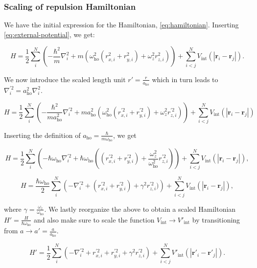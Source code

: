 \documentclass[
]{article}
\begin{document}
\hypertarget{sec:scaled_ham}{%
\subsubsection{Scaling of repulsion Hamiltonian}\label{sec:scaled_ham}}

We have the initial expression for the Hamiltonian,
\eqref{eq:hamiltonian}. Inserting \eqref{eq:external-potential}, we get:

\[ H = \frac{1}{2}\sum_i^N \left(-\frac{\hbar^2}{m}\nabla^2_i + m\left(\omega_\text{ho}^2 (r_{x, i}^2 + r_{y, i}^2) + \omega_z^2 r_{z, i}^2\right)\right) + \sum_{i<j}^N V_\text{int}(|\mathbf r_i - \mathbf r_j|) .\]

We now introduce the scaled length unit \(r' = \frac{r}{a_\text{ho}}\)
which in turn leads to
\(\nabla^{\prime 2}_i = a_\text{ho}^2\nabla_i^2\).

\[ H = \frac{1}{2}\sum_i^N \left(-\frac{\hbar^2}{ma_\text{ho}^2}\nabla^{\prime 2}_i  + ma_\text{ho}^2\left(\omega_\text{ho}^2(r_{x, i}^{\prime 2} + r_{y, i}^{\prime 2}) + \omega_z^2 r_{z, i}^{\prime 2}\right)\right) + \sum_{i<j}^N V_\text{int}(|\mathbf r_i - \mathbf r_j|)\]

Inserting the definition of
\(a_\text{ho} = \frac{\hbar}{m\omega_\text{ho}}\), we get

\[ H = \frac{1}{2}\sum_i^N \left(-\hbar\omega_\text{ho}\nabla^{\prime 2}_i  + \hbar\omega_\text{ho}\left((r_{x, i}^{\prime 2} + r_{y, i}^{\prime 2}) + \frac{\omega_z^2}{\omega_\text{ho}^2} r_{z, i}^{\prime 2}\right)\right) + \sum_{i<j}^N V_\text{int}(|\mathbf r_i - \mathbf r_j|), \]

\[ H = \frac{\hbar\omega_\text{ho}}{2}\sum_i^N \left(-\nabla^{\prime 2}_i  + (r_{x, i}^{\prime 2} + r_{y, i}^{\prime 2}) + \gamma^2 r_{z, i}^{\prime 2})\right) + \sum_{i<j}^N V_\text{int}(|\mathbf r_i - \mathbf r_j|), \]

where \(\gamma = \frac{\omega_z}{\omega_\text{ho}}\). We lastly
reorganize the above to obtain a scaled Hamiltonian
\(H' = \frac{H}{\hbar\omega_\text{ho}}\) and also make sure to scale the
function \(V_\text{int}\rightarrow V'_\text{int}\) by transitioning from
\(a\rightarrow a' = \frac{a}{a_\text{ho}}\).

\begin{equation} H' = \frac{1}{2}\sum_i^N \left(-\nabla_i^{\prime 2} + r_{x, i}^{\prime 2} + r_{y, i}^{\prime 2} + \gamma^2 r_{z, i}^{\prime 2}\right) + \sum_{i<j}^N V'_\text{int}(|\mathbf r'_i - \mathbf r'_j|) .\label{eq:scaled_ham_appendix}\end{equation}
\end{document}
